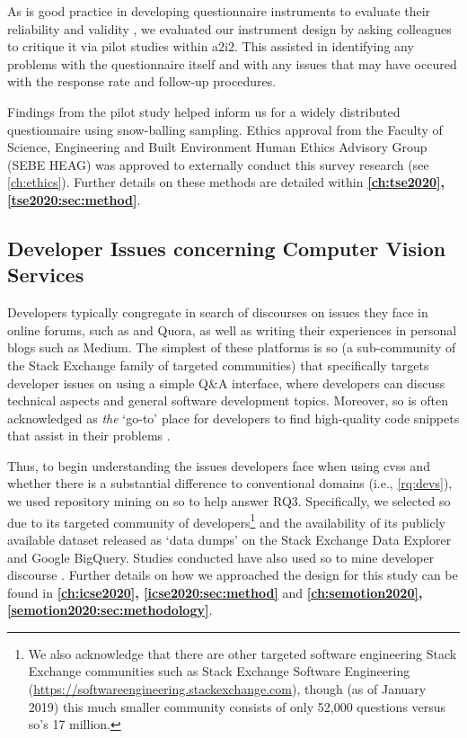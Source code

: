 As is good practice in developing questionnaire instruments to evaluate their reliability and validity \citep{Litwin:1995wt}, we evaluated our instrument design by asking colleagues to critique it via pilot studies within \gls{a2i2}. This assisted in identifying any problems with the questionnaire itself and with any issues that may have occured with the response rate and follow-up procedures.

Findings from the pilot study helped inform us for a widely distributed questionnaire using snow-balling sampling. Ethics approval from the Faculty of Science, Engineering and Built Environment Human Ethics Advisory Group (SEBE HEAG) was approved to externally conduct this survey research (see \cref{ch:ethics}). 
Further details on these methods are detailed within \textbf{\cref{ch:tse2020}, \cref{tse2020:sec:method}}.

\subsection{Developer Issues concerning Computer Vision Services}

Developers typically congregate in search of discourses on issues they face in online forums, such as  and Quora, as well as writing their experiences in personal blogs such as Medium. The simplest of these platforms is \gls{so} (a sub-community of the Stack Exchange family of targeted communities) that specifically targets developer issues on using a simple Q\&A interface, where developers can discuss technical aspects and general software development topics. Moreover, \gls{so} is often acknowledged as \textit{the} `go-to' place for developers to find high-quality code snippets that assist in their problems \citep{Subramanian:2014bg}.

Thus, to begin understanding the issues developers face when using \glspl{cvs} and whether there is a substantial difference to conventional domains (i.e., \ref{rq:devs}), we used repository mining on \gls{so} to help answer RQ3. Specifically, we selected \gls{so} due to its targeted community of developers\footnote{We also acknowledge that there are other targeted software engineering Stack Exchange communities such as Stack Exchange Software Engineering (\url{https://softwareengineering.stackexchange.com}), though (as of January 2019) this much smaller community consists of only 52,000 questions versus \gls{so}'s 17 million.} and the availability of its publicly available dataset released as `data dumps' on the Stack Exchange Data Explorer and Google BigQuery. Studies conducted have also used \gls{so} to mine developer discourse \citep{Choi:2015wo,Sinha:2013tt,Novielli:2015vda,Rosen:2016uk,Pal:2012te,Bajaj:2014wg,LinaresVasquez:2014vj,Wang:2013ue,Barua:2012gz,Reboucas:2016tw,Allamanis:2013is,Tahir:2018ks}.
Further details on how we approached the design for this study can be found in \textbf{\cref{ch:icse2020}, \cref{icse2020:sec:method}} and \textbf{\cref{ch:semotion2020}, \cref{semotion2020:sec:methodology}}.

